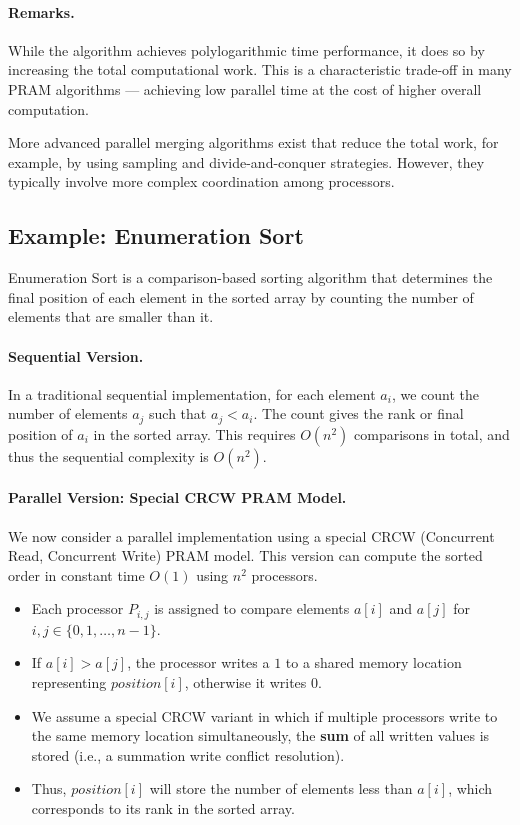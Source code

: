 \documentclass[12pt]{book}
\begin{document}
\paragraph{Remarks.}  
While the algorithm achieves polylogarithmic time performance, it does so by increasing the total computational work. This is a characteristic trade-off in many PRAM algorithms — achieving low parallel time at the cost of higher overall computation.

More advanced parallel merging algorithms exist that reduce the total work, for example, by using sampling and divide-and-conquer strategies. However, they typically involve more complex coordination among processors.

\subsection{Example: Enumeration Sort}

Enumeration Sort is a comparison-based sorting algorithm that determines the final position of each element in the sorted array by counting the number of elements that are smaller than it.

\paragraph{Sequential Version.}  
In a traditional sequential implementation, for each element $a_i$, we count the number of elements $a_j$ such that $a_j < a_i$. The count gives the rank or final position of $a_i$ in the sorted array. This requires $O(n^2)$ comparisons in total, and thus the sequential complexity is $O(n^2)$.

\paragraph{Parallel Version: Special CRCW PRAM Model.}  
We now consider a parallel implementation using a special CRCW (Concurrent Read, Concurrent Write) PRAM model. This version can compute the sorted order in constant time $O(1)$ using $n^2$ processors.

\begin{itemize}
    \item Each processor $P_{i,j}$ is assigned to compare elements $a[i]$ and $a[j]$ for $i, j \in \{0, 1, \dots, n-1\}$.
    \item If $a[i] > a[j]$, the processor writes a $1$ to a shared memory location representing $position[i]$, otherwise it writes $0$.
    \item We assume a special CRCW variant in which if multiple processors write to the same memory location simultaneously, the \textbf{sum} of all written values is stored (i.e., a summation write conflict resolution).
    \item Thus, $position[i]$ will store the number of elements less than $a[i]$, which corresponds to its rank in the sorted array.
\end{itemize}
\end{document}
